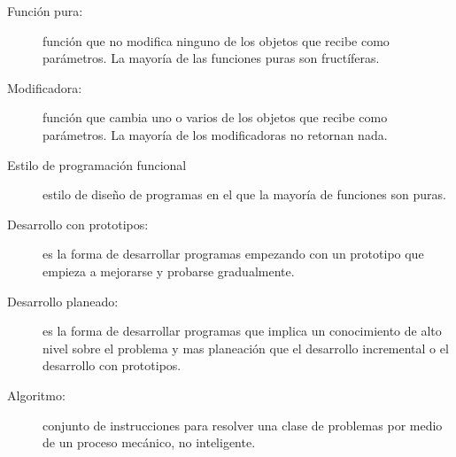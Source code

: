 \begin{description}

\item[Función pura:] función que no modifica ninguno de los objetos
que recibe como parámetros. La mayoría de las funciones puras son 
fructíferas.

\item[Modificadora:] función que cambia uno o varios de los objetos
que recibe como parámetros. La mayoría de los modificadoras no retornan
nada.

\item[Estilo de programación funcional] estilo de diseño de programas en 
el que la mayoría de funciones son puras.

\item[Desarrollo con prototipos:] es la forma de desarrollar programas empezando
con un prototipo que empieza a mejorarse y probarse gradualmente.

\item[Desarrollo planeado:] es la forma de desarrollar programas que implica
un conocimiento de alto nivel sobre el problema y mas planeación que
el desarrollo incremental o el desarrollo con prototipos.

\item[Algoritmo:]  conjunto de instrucciones para resolver una clase de
problemas por medio de un proceso mecánico, no inteligente.


\end{description}
